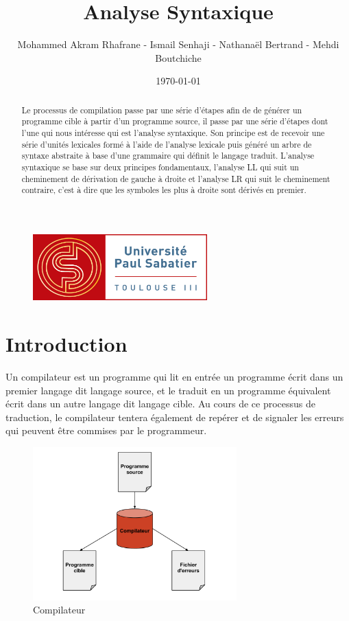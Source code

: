 \documentclass{article}
\title{Analyse Syntaxique}
\author{Mohammed Akram Rhafrane - Ismail Senhaji - Nathanaël Bertrand - Mehdi Boutchiche\\}
\date{\today}
\begin{document}
\begin{figure}[t]
	\centering
		\includegraphics[width=0.60\textwidth]{logo-ups.jpg}
	\label{fig:logo-ups}
\end{figure}

\maketitle

\newpage
\tableofcontents

\newpage
\begin{abstract}
Le processus de compilation passe par une série d’étapes afin de de générer un programme cible à partir d’un programme source, il passe par une série d’étapes dont l’une qui nous intéresse qui est l’analyse syntaxique. Son principe est de recevoir une série d’unités lexicales formé à l’aide de l’analyse lexicale puis généré un arbre de syntaxe abstraite à base d’une grammaire qui définit le langage traduit. L’analyse syntaxique se base sur deux principes fondamentaux, l’analyse LL qui suit un cheminement de dérivation de gauche à droite et l’analyse LR qui suit le cheminement contraire, c’est à dire que les symboles les plus à droite sont dérivés en premier.
\end{abstract}

\section{Introduction}
\label{hints}
Un compilateur est un programme qui lit en entrée un programme écrit dans un premier langage dit langage source, et le traduit en un programme équivalent écrit dans un autre langage dit langage cible.
Au cours de ce processus de traduction, le compilateur tentera également de repérer et de signaler les erreurs qui peuvent être commises par le programmeur.

\begin{figure}[h]
	\centering
		\includegraphics[width=0.70\textwidth]{compilateur.png}
	\caption{Compilateur}
	\label{fig:compilateur}
\end{figure}\FloatBarrier
\end{document}
